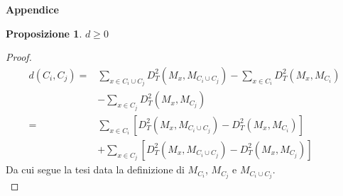 \documentclass[a4, landscape]{seminar}
\theoremstyle{definition}
\newtheorem*{prop}{Proposizione}
\def\bc{\begin{center}}
\def\ec{\end{center}}
\def\bs{\begin{slide}\begingroup\small}
\def\es{\endgroup\end{slide}}
\begin{document}
\bs
\bc{\bf\color{blue}Appendice}\ec
\begin{prop}
  $d\geq 0$
\end{prop}
\begin{proof}\hfill
\begin{equation*}
\begin{aligned}
d\left(C_{i}, C_{j}\right)=& \sum_{x \in C_{i} \cup C_{j}} D_{T}^{2}\left(M_{x}, M_{C_{i} \cup C_{j}}\right)-\sum_{x \in C_{i}} D_{T}^{2}\left(M_{x}, M_{C_{i}}\right) \\
&-\sum_{x \in C_{j}} D_{T}^{2}\left(M_{x}, M_{C_{j}}\right) \\
=& \sum_{x \in C_{i}} \left[D_{T}^{2}\left(M_{x}, M_{C_{i} \cup C_{j}}\right)- D_{T}^{2}\left(M_{x}, M_{C_{i}}\right)\right] \\
&+\sum_{x \in C_{j}} \left[D_{T}^{2}\left(M_{x}, M_{C_{i} \cup C_{j}}\right)-D_{T}^{2}\left(M_{x}, M_{C_{j}}\right)\right]
\end{aligned}
\end{equation*}
Da cui segue la tesi data la definizione di $M_{C_i}$, $M_{C_j}$ e $M_{C_i\cup C_j}$. \\
\end{proof}
\es
\end{document}
